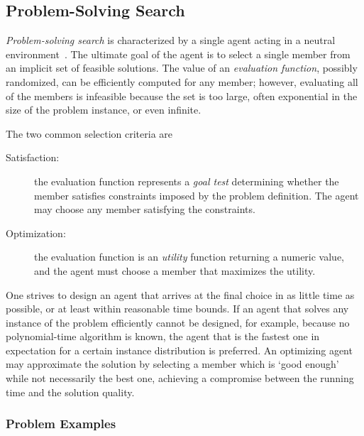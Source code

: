 \subsection{Problem-Solving Search}

{\em Problem-solving search} is characterized by a single agent acting
in a neutral environment~\cite{Russell.aima}. The ultimate goal of the
agent is to select a single member from an implicit set of feasible
solutions. The value of an {\em evaluation function}, possibly
randomized, can be efficiently computed for any member; however,
evaluating all of the members is infeasible because the set is too
large, often exponential in the size of the problem instance, or
even infinite.

The two common selection criteria are 
\begin{description}
  \item[Satisfaction:] the evaluation function represents a {\em goal
    test} determining whether the member satisfies constraints imposed
    by the problem definition. The agent may choose any member
    satisfying the constraints.

  \item[Optimization:] the evaluation function is an {\em utility} function
    returning a numeric value, and the agent must choose a member that
    maximizes the utility.
\end{description}

One strives to design an agent that arrives at the final choice in as
little time as possible, or at least within reasonable time bounds.
If an agent that solves any instance of the problem efficiently cannot
be designed, for example, because no polynomial-time algorithm is
known, the agent that is the fastest one in expectation for a certain
instance distribution is preferred.  An optimizing agent may
approximate the solution by selecting a member which is `good enough'
while not necessarily the best one, achieving a compromise between the
running time and the solution quality.

\subsubsection{Problem Examples}

